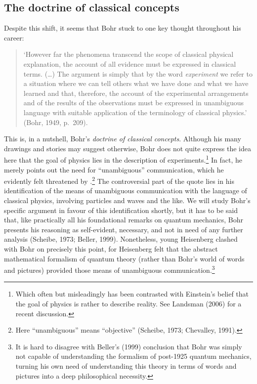 \documentclass[12pt,titlepage]{article}
\begin{document}
\subsection{The doctrine of classical concepts}\label{Pcl}
Despite this shift, it seems that Bohr stuck to one key thought throughout his  career:
\begin{quote}
 `However far the phenomena transcend the scope of classical physical explanation, the account of all evidence must be expressed in classical terms. (\ldots) The argument is simply that by the word {\it experiment} we refer to a situation where we can tell others what we have done and what we have learned and that, therefore, the account of the experimental arrangements and of the results of the observations must be expressed in unambiguous language with suitable application of the terminology of classical physics.' (Bohr, 1949, p.\ 209).
\end{quote}

This is, in a nutshell, Bohr's {\it doctrine of classical concepts}. 
Although his many drawings and stories may suggest otherwise, Bohr does not quite express the idea here that the goal of physics lies in the description of experiments.\footnote{Which often but misleadingly has been contrasted with
Einstein's  belief that the  goal of physics is rather to describe reality.
See Landsman (2006) for a recent discussion. } In fact, he merely points out the need for ``unambiguous''  communication, which he evidently felt threatened by  \qm.\footnote{Here  ``unambiguous'' means ``objective'' (Scheibe, 1973; Chevalley, 1991).}
The controversial part of the quote lies in his identification of the means of unambiguous communication with the language of classical physics, involving particles and waves and the like. We will study Bohr's specific argument in favour of this identification shortly, but it has to be said that, like practically all his foundational remarks on quantum mechanics, Bohr presents his reasoning as self-evident, necessary, and not in need of any further analysis (Scheibe, 1973; Beller, 1999).  Nonetheless, young Heisenberg clashed with Bohr on precisely this point, for  Heisenberg felt that the abstract mathematical formalism of quantum theory (rather than Bohr's world of words and pictures) provided those means of unambiguous communication.\footnote{It is hard to disagree with Beller's (1999) conclusion that Bohr was simply not capable of understanding the formalism of post-1925 quantum mechanics, turning his own  need of understanding this theory in terms of words and pictures into a deep philosophical necessity.}
\end{document}
